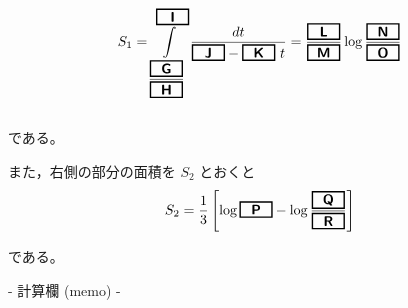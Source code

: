 \documentclass[dvipdfmx,twoside]{jsarticle}
\newcommand{\ab}[1]{%
\begin{tikzpicture}[baseline]
\node[draw=black, 
      rectangle, 
      minimum width=0.8cm, 
      minimum height=0.3cm, 
      font=\bfseries,
      line width=1pt,
      inner sep=2pt,
      anchor=base] {#1};
\end{tikzpicture}%
}
\begin{document}
\begin{CJK}{UTF8}{ipxm}
\begin{align*}
S_1 = \displaystyle\int\limits_{\dfrac{\ab{\textsf{G}}}{\ab{\textsf{H}}}}^{\ab{\textsf{I}}} \dfrac{dt}{\ab{\textsf{J}} - \ab{\textsf{K}}\ t} = \dfrac{\ab{\textsf{L}}}{\ab{\textsf{M}}} \log \dfrac{\ab{\textsf{N}}}{\ab{\textsf{O}}}
\end{align*}
\\

である。

\vspace{1em}

また，右側の部分の面積を $S_2$ とおくと
\begin{align*}
S_2 = \dfrac{1}{3}\left[\log \ab{\textsf{P}}  - \log \dfrac{\ab{\textsf{Q}}}{\ab{\textsf{R}}}\right]
\end{align*}

である。
\newpage
\begin{center}
- 計算欄 (memo) -
\end{center}

\end{CJK}
\end{document}
